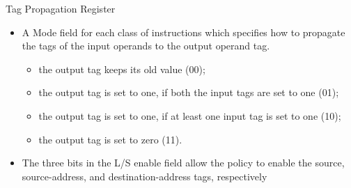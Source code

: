 \begin{frame}[noframenumbering]{Tag Propagation Register}
    \begin{itemize}
        \justifying
        \item A Mode field for each class of instructions which specifies how to propagate the tags of the input operands to the output operand tag.
              \begin{itemize}
                  \justifying
                  \item the output tag keeps its old value (00);
                  \item the output tag is set to one, if both the input tags are set to one (01);
                  \item the output tag is set to one, if at least one input tag is set to one (10);
                  \item the output tag is set to zero (11).
              \end{itemize}
        \item The three bits in the L/S enable field allow the policy to enable the source, source-address, and destination-address tags, respectively
    \end{itemize}
\end{frame}

